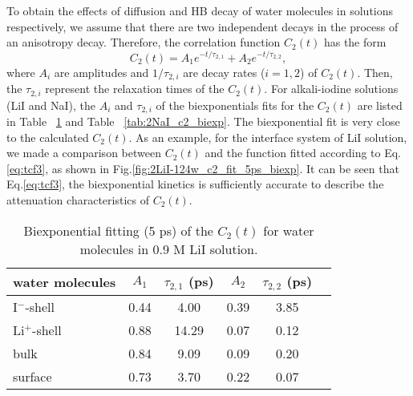 To obtain the effects of diffusion and HB decay of water molecules
in solutions respectively, we assume that there are two independent 
decays in the process of an anisotropy decay. 
Therefore, the correlation function $C_2(t)$ has the form \cite{TanHS05}
\begin{equation}
C_2(t)=A_1e^{-t/\tau_{2,1}} +A_2e^{-t/\tau_{2,2}},
\label{eq:tcf3}
\end{equation}
where $A_i$ are amplitudes and $1/\tau_{2,i}$ are decay rates ($i=1, 2$) of $C_2(t)$. 
Then, the $\tau_{2,i}$ represent the relaxation times of the $C_2(t)$. 
For alkali-iodine solutions (LiI and NaI), the $A_i$ and $\tau_{2,i}$ of the biexponentials fits for 
the $C_2(t)$ are listed in Table ~\ref{tab:2LiI_c2_biexp} and Table ~\ref{tab:2NaI_c2_biexp}.
The biexponential fit is very close to the calculated $C_2(t)$. 
As an example, for the interface system of LiI solution, we made a comparison between $C_2(t)$ 
and the function fitted according to Eq.\thinspace\ref{eq:tcf3},
as shown in Fig.\thinspace\ref{fig:2LiI-124w_c2_fit_5ps_biexp}. 
It can be seen that Eq.\thinspace\ref{eq:tcf3}, the biexponential kinetics is sufficiently accurate to 
describe the attenuation characteristics of $C_2(t)$.                        
\begin{table}[H]%
\centering
\caption{\label{tab:2LiI_c2_biexp}%
	Biexponential fitting (5 ps) of the $C_2(t)$ for water molecules in 0.9 M LiI solution.}
\begin{tabular}{lccccc}
water molecules & $A_1$  & $\tau_{2,1}$ (ps) & $A_2$ & $\tau_{2,2}$ (ps) \\
\hline
I$^-$-shell & 0.44 & 4.00 & 0.39 & 3.85\\
Li$^+$-shell & 0.88 & 14.29 & 0.07 & 0.12\\
bulk & 0.84 & 9.09 & 0.09 & 0.20 \\
surface & 0.73 & 3.70 & 0.22 & 0.07 \\
\end{tabular}
\end{table}

